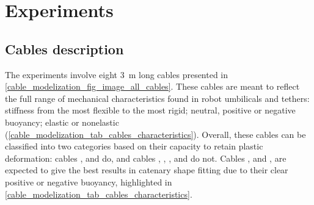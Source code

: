 \section{Experiments}\label{cable_modelization_sec_experiment}

\subsection{Cables description}
\label{cable_modelization_subsec_cable}

The experiments involve eight \qty{3}{\m} long cables presented in
\cref{cable_modelization_fig_image_all_cables}. These cables are meant to reflect the full range of
mechanical characteristics found in robot umbilicals and tethers: stiffness from the most flexible
to the most rigid; neutral, positive or negative buoyancy; elastic or nonelastic
(\cref{cable_modelization_tab_cables_characteristics}). Overall, these cables can be classified
into two categories based on their capacity to retain plastic deformation: cables
,  and
 do, and cables
, ,
,  and
 do not. Cables
,  and
, are expected to give the best results in catenary
shape fitting due to their clear positive or negative buoyancy, highlighted in
\cref{cable_modelization_tab_cables_characteristics}.

